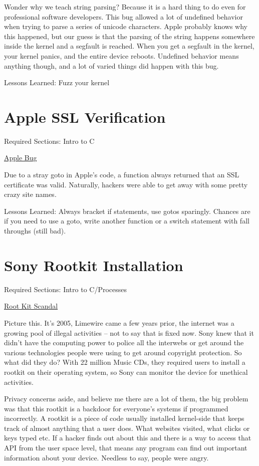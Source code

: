 Wonder why we teach string parsing? Because it is a hard thing to do even for professional software developers. This bug allowed a lot of undefined behavior when trying to parse a series of unicode characters.
Apple probably knows why this happened, but our guess is that the parsing of the string happens somewhere inside the kernel and a segfault is reached.
When you get a segfault in the kernel, your kernel panics, and the entire device reboots.
Undefined behavior means anything though, and a lot of varied things did happen with this bug.

Lessons Learned: Fuzz your kernel

\section{Apple SSL Verification}

Required Sections: Intro to C

\href{https://en.wikipedia.org/wiki/Unreachable_code#Examples}{Apple Bug}


Due to a stray goto in Apple's code, a function always returned that an SSL certificate was valid.
Naturally, hackers were able to get away with some pretty crazy site names.

Lessons Learned: Always bracket if statements, use gotos sparingly. Chances are if you need to use a goto, write another function or a switch statement with fall throughs (still bad).

\section{Sony Rootkit Installation}

Required Sections: Intro to C/Processes

\href{https://en.wikipedia.org/wiki/Sony_BMG_copy_protection_rootkit_scandal}{Root Kit Scandal}

Picture this.
It's 2005, Limewire came a few years prior, the internet was a growing pool of illegal activities -- not to say that is fixed now.
Sony knew that it didn't have the computing power to police all the interwebs or get around the various technologies people were using to get around copyright protection.
So what did they do?
With 22 million Music CDs, they required users to install a rootkit on their operating system, so Sony can monitor the device for unethical activities.

Privacy concerns aside, and believe me there are a lot of them, the big problem was that this rootkit is a backdoor for everyone's systems if programmed incorrectly.
A rootkit is a piece of code usually installed kernel-side that keeps track of almost anything that a user does.
What websites visited, what clicks or keys typed etc.
If a hacker finds out about this and there is a way to access that API from the user space level, that means any program can find out important information about your device.
Needless to say, people were angry.

